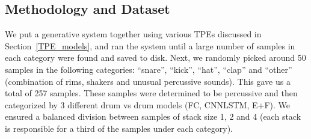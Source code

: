 \documentclass[\main/thesis.tex]{subfiles}
\begin{document}
\begin{table}[htbp]
\caption{\label{kappa_table_TPE}Table of Fleiss' kappa coefficients to measure the degree of agreement between persons (HvH) and various TPEs: persons with FC model (H+FC), persons with CNNLSTM model, persons with all models (H+E/F), and between the 3 models. \enquote{Drop Rule} column indicates if any samples were dropped. We show the measurements after dropping samples if they are deemed bad by either or both responders. We also show measurements after dropping the \enquote{other} category along with samples deemed bad by either responder. }
\end{table}

 
 \subsection{Methodology and Dataset}
  We put a generative system together using various TPEs discussed in Section~\ref{TPE_models}, and ran the system until a large number of samples in each category were found and saved to disk. Next, we randomly picked around 50 samples in the following categories: \enquote{snare}, \enquote{kick}, \enquote{hat}, \enquote{clap} and \enquote{other} (combination of rims, 
shakers and unusual percussive sounds). This gave us a total of 257 samples. These samples were determined to be percussive and then categorized by 3 different drum vs drum models (FC, CNNLSTM, E+F). We ensured a balanced division between samples of stack size 1, 2 and 4 (each stack is responsible for a third of the samples under each category).
\end{document}
